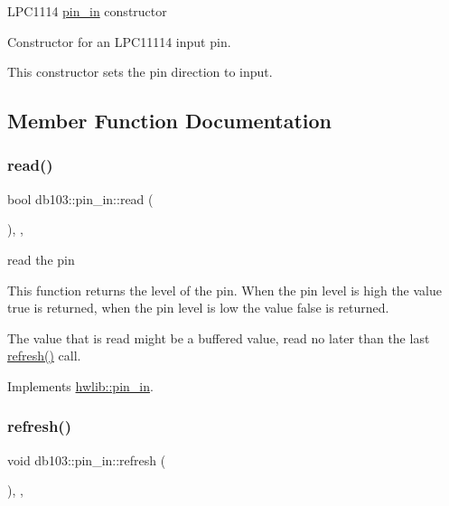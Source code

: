 L\+P\+C1114 \hyperlink{classdb103_1_1pin__in}{pin\+\_\+in} constructor

Constructor for an L\+P\+C11114 input pin.

This constructor sets the pin direction to input. 

\subsection{Member Function Documentation}
\mbox{\label{classdb103_1_1pin__in_aa45255f1a10bf9496f165e591d5cb329}} 
\subsubsection{\texorpdfstring{read()}{read()}}
{\footnotesize\ttfamily bool db103\+::pin\+\_\+in\+::read (\begin{DoxyParamCaption}{ }\end{DoxyParamCaption})\hspace{0.3cm}{\ttfamily [inline]}, {\ttfamily [override]}, {\ttfamily [virtual]}}





read the pin

This function returns the level of the pin. When the pin level is high the value true is returned, when the pin level is low the value false is returned.

The value that is read might be a buffered value, read no later than the last \hyperlink{classdb103_1_1pin__in_a7581d464f903d09f945b595b3c0f9163}{refresh()} call. 

Implements \hyperlink{classhwlib_1_1pin__in_ad071bd2e17bb4af51390f6cbb728a194}{hwlib\+::pin\+\_\+in}.

\mbox{\label{classdb103_1_1pin__in_a7581d464f903d09f945b595b3c0f9163}} 
\subsubsection{\texorpdfstring{refresh()}{refresh()}}
{\footnotesize\ttfamily void db103\+::pin\+\_\+in\+::refresh (\begin{DoxyParamCaption}{ }\end{DoxyParamCaption})\hspace{0.3cm}{\ttfamily [inline]}, {\ttfamily [override]}, {\ttfamily [virtual]}}





